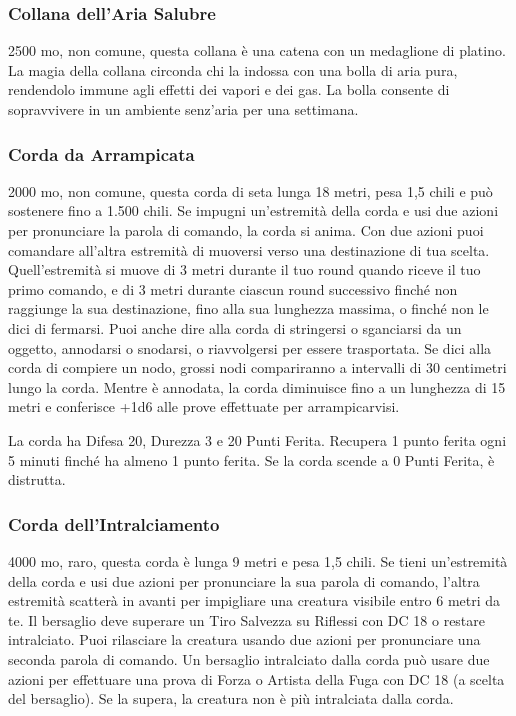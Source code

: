 \begin{multicols}{2}
\subsubsection*{Collana dell’Aria Salubre}
2500 mo, non comune, questa collana è una catena con un medaglione di platino. La magia della collana circonda chi la indossa con una bolla di aria pura, rendendolo immune agli effetti dei vapori e dei gas. La bolla consente di sopravvivere in un ambiente senz’aria per una settimana.

\subsubsection*{Corda da Arrampicata}
2000 mo, non comune, questa corda di seta lunga 18 metri, pesa 1,5 chili e può sostenere fino a 1.500 chili. Se impugni un'estremità della corda e usi due azioni per pronunciare la parola di comando, la corda si anima. Con due azioni puoi comandare all'altra estremità di muoversi verso una destinazione di tua scelta. Quell'estremità si muove di 3 metri durante il tuo round quando riceve il tuo primo comando, e di 3 metri durante ciascun round successivo finché non raggiunge la sua destinazione, fino alla sua lunghezza massima, o finché non le dici di fermarsi. Puoi anche dire alla corda di stringersi o sganciarsi da un oggetto, annodarsi o snodarsi, o riavvolgersi per essere trasportata. Se dici alla corda di compiere un nodo, grossi nodi compariranno a intervalli di 30 centimetri lungo la corda. Mentre è annodata, la corda diminuisce fino a un lunghezza di 15 metri e conferisce +1d6 alle prove effettuate per arrampicarvisi.

La corda ha Difesa 20, Durezza 3 e 20 Punti Ferita. Recupera 1 punto ferita ogni 5 minuti finché ha almeno 1 punto ferita. Se la corda scende a 0 Punti Ferita, è distrutta.

\subsubsection*{Corda dell'Intralciamento}
4000 mo, raro, questa corda è lunga 9 metri e pesa 1,5 chili. Se tieni un'estremità della corda e usi due azioni per pronunciare la sua parola di comando, l'altra estremità scatterà in avanti per impigliare una creatura visibile entro 6 metri da te. Il bersaglio deve superare un Tiro Salvezza su Riflessi con DC 18 o restare intralciato. Puoi rilasciare la creatura usando due azioni per pronunciare una seconda parola di comando. Un bersaglio intralciato dalla corda può usare due azioni per effettuare una prova di Forza o Artista della Fuga con DC 18 (a scelta del bersaglio). Se la supera, la creatura non è più intralciata dalla corda.


\end{multicols}
